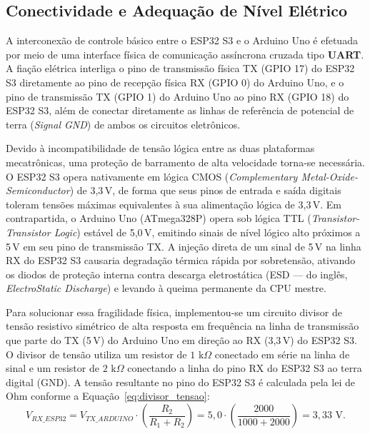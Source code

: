 \subsection{Conectividade e Adequação de Nível Elétrico}
\label{subsec:nivel_eletrico}

A interconexão de controle básico entre o ESP32 S3 e o Arduino Uno é efetuada por meio de uma interface física de comunicação assíncrona cruzada tipo \textbf{UART}. A fiação elétrica interliga o pino de transmissão física TX (GPIO 17) do ESP32 S3 diretamente ao pino de recepção física RX (GPIO 0) do Arduino Uno, e o pino de transmissão TX (GPIO 1) do Arduino Uno ao pino RX (GPIO 18) do ESP32 S3, além de conectar diretamente as linhas de referência de potencial de terra (\textit{Signal GND}) de ambos os circuitos eletrônicos.

Devido à incompatibilidade de tensão lógica entre as duas plataformas mecatrônicas, uma proteção de barramento de alta velocidade torna-se necessária. O ESP32 S3 opera nativamente em lógica CMOS (\textit{Complementary Metal-Oxide-Semiconductor}) de 3{,}3\,V, de forma que seus pinos de entrada e saída digitais toleram tensões máximas equivalentes à sua alimentação lógica de 3{,}3\,V. Em contrapartida, o Arduino Uno (ATmega328P) opera sob lógica TTL (\textit{Transistor-Transistor Logic}) estável de 5{,}0\,V, emitindo sinais de nível lógico alto próximos a 5\,V em seu pino de transmissão TX. A injeção direta de um sinal de 5\,V na linha RX do ESP32 S3 causaria degradação térmica rápida por sobretensão, ativando os diodos de proteção interna contra descarga eletrostática (ESD --- do inglês, \textit{ElectroStatic Discharge}) e levando à queima permanente da CPU mestre.

Para solucionar essa fragilidade física, implementou-se um circuito divisor de tensão resistivo simétrico de alta resposta em frequência na linha de transmissão que parte do TX (5\,V) do Arduino Uno em direção ao RX (3{,}3\,V) do ESP32 S3. O divisor de tensão utiliza um resistor de $1\text{ k}\Omega$ conectado em série na linha de sinal e um resistor de $2\text{ k}\Omega$ conectando a linha do pino RX do ESP32 S3 ao terra digital (GND). A tensão resultante no pino do ESP32 S3 é calculada pela lei de Ohm conforme a Equação~\ref{eq:divisor_tensao}:
\begin{equation}
\label{eq:divisor_tensao}
V_{RX\_ESP32} = V_{TX\_ARDUINO} \cdot \left( \frac{R_2}{R_1 + R_2} \right) = 5{,}0 \cdot \left( \frac{2000}{1000 + 2000} \right) = 3{,}33\text{ V}.
\end{equation}

